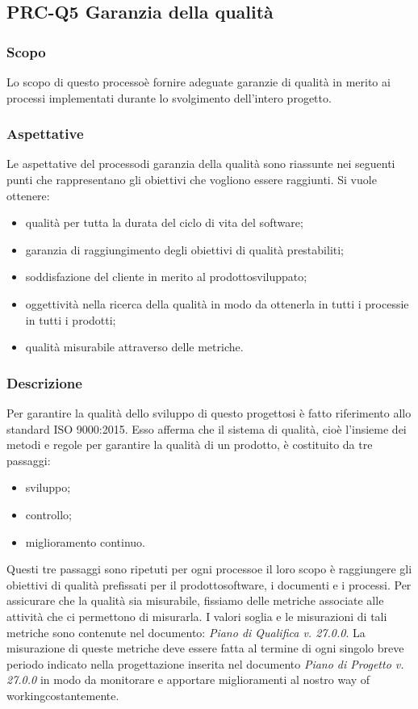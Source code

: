 \subsection{PRC-Q5 Garanzia della qualità}
\subsubsection{Scopo}
Lo scopo di questo processo\glosp è fornire adeguate garanzie di qualità in merito ai processi implementati durante lo svolgimento dell'intero progetto\glo.
\subsubsection{Aspettative}
Le aspettative del processo\glosp di garanzia della qualità sono riassunte nei seguenti punti che rappresentano gli obiettivi che vogliono essere raggiunti. Si vuole ottenere:
\begin{itemize}
	\item qualità per tutta la durata del ciclo di vita del software;
	\item garanzia di raggiungimento degli obiettivi di qualità prestabiliti;
	\item soddisfazione del cliente in merito al prodotto\glosp sviluppato;
	\item oggettività nella ricerca della qualità in modo da ottenerla in tutti i processi\glosp e in tutti i prodotti\glo;
	\item qualità misurabile attraverso delle metriche\glo.
\end{itemize}
\subsubsection{Descrizione}
Per garantire la qualità dello sviluppo di questo progetto\glosp si è fatto riferimento allo standard ISO 9000:2015. Esso afferma che il sistema di qualità, cioè l'insieme dei metodi e regole per garantire la qualità di un prodotto\glo, è costituito da tre passaggi:
\begin{itemize}
	\item sviluppo;
	\item controllo;
	\item miglioramento continuo.
\end{itemize}
Questi tre passaggi sono ripetuti per ogni processo\glosp e il loro scopo è raggiungere gli obiettivi di qualità prefissati per il prodotto\glosp software, i documenti e i processi.
Per assicurare che la qualità sia misurabile, fissiamo delle metriche associate alle attività che ci permettono di misurarla. I valori soglia e le misurazioni di tali metriche sono contenute nel documento: \textit{Piano di Qualifica v. 27.0.0}.
La misurazione di queste metriche deve essere fatta al termine di ogni singolo breve periodo indicato nella progettazione inserita nel documento \textit{Piano di Progetto v. 27.0.0} in modo da monitorare e apportare miglioramenti al nostro way of working\glosp costantemente.
